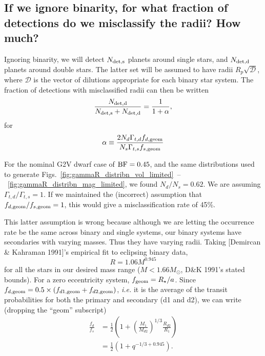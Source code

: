 \documentclass{emulateapj}
\begin{document}
\subsection{If we ignore binarity, for what fraction of 
	detections do we misclassify the radii? How much?}

Ignoring binarity, we will detect $N_{\rm det,s}$ planets around single stars, 
and $N_{\rm det,d}$ planets around double stars. The latter set will be assumed 
to have radii $R_p \sqrt{\mathcal{D}}$, where $\mathcal{D}$ is the vector of 
dilutions appropriate for each binary star system.
The fraction of detections with misclassified radii can then be written
\begin{equation}
\frac{N_{\rm det,d}}{N_{\rm det,s} + N_{\rm det,d}} = \frac{1}{1+\alpha},
\end{equation}
for
\begin{equation}
\alpha \equiv 
\frac{2 N_d \Gamma_{t,d} f_{d,{\rm geom}}}{N_s \Gamma_{t,s} f_{s,{\rm geom}}}
\end{equation}

For the nominal G2V dwarf case of ${\rm BF}=0.45$, and the same distributions 
used to generate 
Figs.~\ref{fig:gammaR_distribn_vol_limited}~--~\ref{fig:gammaR_distribn_mag_limited},
we found $N_d/N_s=0.62$.
We are assuming $\Gamma_{t,d} / \Gamma_{t,s} = 1$.
If we maintained the (incorrect) assumption that $f_{d,{\rm geom}} / f_{s,{\rm 
geom}} = 1$, this would give a misclassification rate of 45\%. 

This latter assumption is wrong because although we are letting the occurrence 
rate be the same across binary and single systems, our binary systems have 
secondaries with varying masses. Thus they have varying radii.
Taking [Demircan \& Kahraman 1991]'s empirical fit to eclipsing binary data,
\begin{equation}
R = 1.06 M^{0.945}
\label{eq:mass_radius}
\end{equation}
for all the stars in our desired mass range ($M < 1.66M_\odot$, D\&K 1991's 
stated bounds).
For a zero eccentricity system, $f_{\rm geom}=R_\star/a$.
Since $f_{d,{\rm geom}} = 0.5\times (f_{d1,{\rm geom}} + f_{d2,{\rm geom}})$, 
\textit{i.e.} it is the average of the transit probabilities for both the 
primary and secondary (d1 and d2), we can write (dropping the ``geom'' 
subscript)
\begin{align}
\frac{f_d}{f_s} &= \frac{1}{2} \left(1 + \left(\frac{M_1}{M_{d2}}\right)^{1/3} 
\frac{R_{d2}}{R_1}\right) \\
&= \frac{1}{2} \left( 1 + q^{-1/3 + 0.945}\right).
\end{align}
\end{document}
